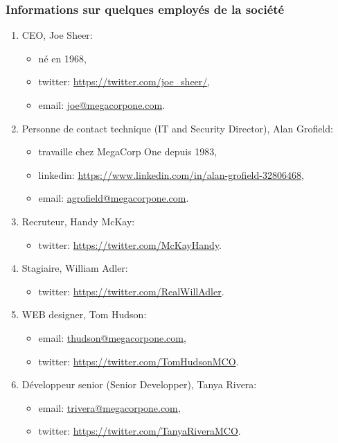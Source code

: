 \documentclass[french,paper=a4,oneside,captions=tableheading]{article}
\begin{document}
\subsubsection{Informations sur quelques employés de la société}

\begin{enumerate}
    \item CEO, Joe Sheer:
    \begin{itemize}
        \item né en 1968,
        \item twitter: \url{https://twitter.com/joe\_sheer/},
        \item email: \url{joe@megacorpone.com}.
    \end{itemize}
    \item Personne de contact technique (IT and Security Director), Alan Grofield:
    \begin{itemize}
        \item travaille chez MegaCorp One depuis 1983,
        \item linkedin: \url{https://www.linkedin.com/in/alan-grofield-32806468},
        \item email: \url{agrofield@megacorpone.com}.
    \end{itemize}
    \item Recruteur, Handy McKay:
    \begin{itemize}
        \item twitter: \url{https://twitter.com/McKayHandy}.
    \end{itemize}
    \item Stagiaire, William Adler:
    \begin{itemize}
        \item twitter: \url{https://twitter.com/RealWillAdler}.
    \end{itemize}
    \item WEB designer, Tom Hudson:
    \begin{itemize}
        \item email: \url{thudson@megacorpone.com},
        \item twitter: \url{https://twitter.com/TomHudsonMCO}.
    \end{itemize}
    \item Développeur senior (Senior Developper), Tanya Rivera:
    \begin{itemize}
        \item email: \url{trivera@megacorpone.com},
        \item twitter: \url{https://twitter.com/TanyaRiveraMCO}.

\end{itemize}
\end{enumerate}
\end{document}
